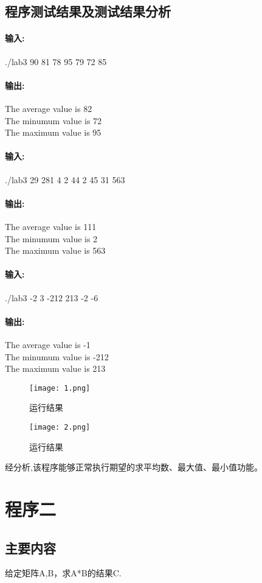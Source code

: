 \documentclass[UTF8]{ctexart}
\begin{document}
\subsection{程序测试结果及测试结果分析}
\paragraph{输入:}./lab3 90 81 78 95 79 72 85
\paragraph{输出:}The average value is 82\\
The minumum value is 72\\
The maximum value is 95\\
\paragraph{输入:}./lab3 29 281 4 2 44 2 45 31 563
\paragraph{输出:}The average value is 111\\
The minumum value is 2\\
The maximum value is 563\\
\paragraph{输入:}./lab3 -2 3 -212 213 -2 -6
\paragraph{输出:}The average value is -1\\
The minumum value is -212\\
The maximum value is 213\\
\begin{figure}[htbp]
    \centering
    \texttt{[image: 1.png]}
    \caption{运行结果}
\end{figure} 
\begin{figure}[htbp]
    \centering
    \texttt{[image: 2.png]}
    \caption{运行结果}
\end{figure} 
经分析,该程序能够正常执行期望的求平均数、最大值、最小值功能。
\section{程序二}
\subsection{主要内容}
给定矩阵A,B，求A*B的结果C.
\end{document}
